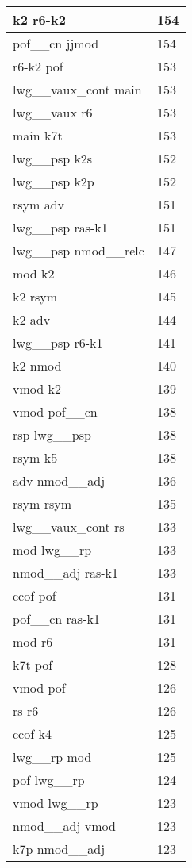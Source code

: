 \documentclass[a4 paper]{article}
\begin{document}
\begin{longtable}{p{}p{}}
k2 r6-k2  & 154 \\ \midrule
pof\_\_cn jjmod  & 154 \\ \midrule
r6-k2 pof  & 153 \\ \midrule
lwg\_\_vaux\_cont main  & 153 \\ \midrule
lwg\_\_vaux r6  & 153 \\ \midrule
main k7t  & 153 \\ \midrule
lwg\_\_psp k2s  & 152 \\ \midrule
lwg\_\_psp k2p  & 152 \\ \midrule
rsym adv  & 151 \\ \midrule
lwg\_\_psp ras-k1  & 151 \\ \midrule
lwg\_\_psp nmod\_\_relc  & 147 \\ \midrule
mod k2  & 146 \\ \midrule
k2 rsym  & 145 \\ \midrule
k2 adv  & 144 \\ \midrule
lwg\_\_psp r6-k1  & 141 \\ \midrule
k2 nmod  & 140 \\ \midrule
vmod k2  & 139 \\ \midrule
vmod pof\_\_cn  & 138 \\ \midrule
rsp lwg\_\_psp  & 138 \\ \midrule
rsym k5  & 138 \\ \midrule
adv nmod\_\_adj  & 136 \\ \midrule
rsym rsym  & 135 \\ \midrule
lwg\_\_vaux\_cont rs  & 133 \\ \midrule
mod lwg\_\_rp  & 133 \\ \midrule
nmod\_\_adj ras-k1  & 133 \\ \midrule
ccof pof  & 131 \\ \midrule
pof\_\_cn ras-k1  & 131 \\ \midrule
mod r6  & 131 \\ \midrule
k7t pof  & 128 \\ \midrule
vmod pof  & 126 \\ \midrule
rs r6  & 126 \\ \midrule
ccof k4  & 125 \\ \midrule
lwg\_\_rp mod  & 125 \\ \midrule
pof lwg\_\_rp  & 124 \\ \midrule
vmod lwg\_\_rp  & 123 \\ \midrule
nmod\_\_adj vmod  & 123 \\ \midrule
k7p nmod\_\_adj  & 123 \\ \midrule

\end{longtable}
\end{document}
